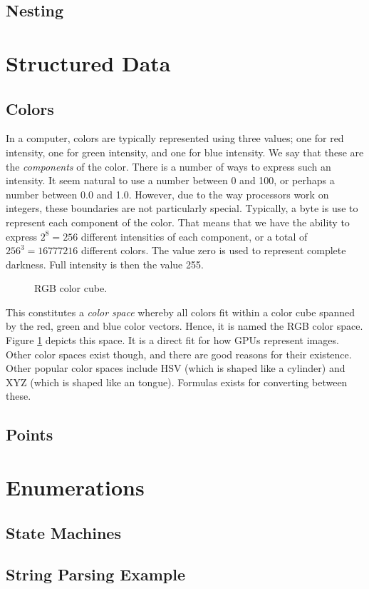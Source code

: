 \subsection{Nesting}

\section{Structured Data}

\subsection{Colors}

In a computer, colors are typically represented using three values; one for red intensity, one for green intensity, and one for blue intensity. We say that these are the \textsl{components} of the color. There is a number of ways to express such an intensity. It seem natural to use a number between 0 and 100, or perhaps a number between 0.0 and 1.0. However, due to the way processors work on integers, these boundaries are not particularly special. Typically, a byte is use to represent each component of the color. That means that we have the ability to express $2^8=256$ different intensities of each component, or a total of $256^3=16777216$ different colors. The value zero is used to represent complete darkness. Full intensity is then the value 255.

\begin{figure}[tbp]
  
  \caption{RGB color cube.}
  \label{fig:primdata:struct:color}
\end{figure}

This constitutes a \textsl{color space} whereby all colors fit within a color cube spanned by the red, green and blue color vectors. Hence, it is named the RGB color space. Figure \ref{fig:primdata:struct:color} depicts this space. It is a direct fit for how GPUs represent images. Other color spaces exist though, and there are good reasons for their existence. Other popular color spaces include HSV (which is shaped like a cylinder) and XYZ (which is shaped like an tongue). Formulas exists for converting between these.


\subsection{Points}

\section{Enumerations}

\subsection{State Machines}

\subsection{String Parsing Example}

